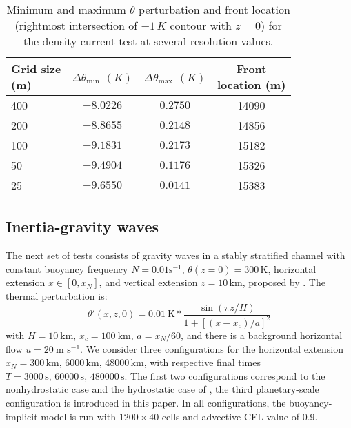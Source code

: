 \documentclass{ametsoc}
\theoremstyle{definition}
\begin{document}
\begin{table}
\small
\begin{centering}
\begin{tabular}{lccc}
\toprule 
\shortstack{Grid size \\ (m)}& \shortstack{$\Delta\theta_\textrm{min}$ \\ $(K)$} & \shortstack{$\Delta\theta_\textrm{max}$ \\ $(K)$} & \shortstack{Front\\ location (m)} \tabularnewline
\midrule 
400 &  $-8.0226$ & $ 0.2750$ & 14090\tabularnewline
200 &  $-8.8655$ & $0.2148$ & 14856\tabularnewline
100 &  $-9.1831$ & $0.2173$ & 15182\tabularnewline
50 &  $-9.4904$ & $0.1176$ & 15326\tabularnewline
25 &  $-9.6550$ & $0.0141$ & 15383\tabularnewline
\bottomrule 
\end{tabular}
\par\end{centering}
\caption{Minimum and maximum $\theta$ perturbation and front location
(rightmost intersection of $-1\,K$ contour with $z=0$) for the density current test at several resolution values.}%
\label{tab:straka_minmax}
\end{table}


\subsection{Inertia-gravity waves} 

The next set of tests consists of gravity waves in a stably stratified channel with constant buoyancy frequency $N=0.01\textrm{s}^{-1}$, $\theta(z=0)=300\,\textrm{K}$, horizontal extension $x\in[0,x_N]$, and vertical extension $z=10\,\textrm{km}$, proposed by \cite{SkamarockKlemp1994}. The thermal perturbation is:
%
\begin{equation}
 \theta'(x, z, 0)=0.01~\textrm{K}*\dfrac{\sin(\pi z/H)}{1+[(x-x_c)/a]^2}\label{eq: init_theta_pert_igw} 
\end{equation} 
%
with $H=10~\textrm{km}$, $x_c=100~\textrm{km}$, $a=x_N/60$, and there is a background horizontal flow $u=20~\textrm{m s}^{-1}$. We consider three configurations for the horizontal extension $x_N=300\,\textrm{km},\,6000\,\textrm{km},\,48000\,\textrm{km}$, with respective final times $T=3000\,\textrm{s},\,60000\,\textrm{s},\,480000\,\textrm{s}$. The first two configurations correspond to the nonhydrostatic case and the hydrostatic case of \cite{SkamarockKlemp1994}, the third planetary-scale configuration is introduced in this paper. In all configurations, the buoyancy-implicit model is run with $1200\times40$ cells and advective CFL value of 0.9. 
\end{document}
